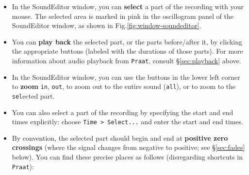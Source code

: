 \documentclass[
]{book}
\begin{document}
\begin{itemize}
\item
  In the SoundEditor window, you can \textbf{select} a part of the recording with your mouse. The selected area is marked in pink in the oscillogram panel of the SoundEditor window, as shown in Fig.\ref{fig:window-soundeditor}.
\item
  You can \textbf{play back} the selected part, or the parts before/after it, by clicking the appropriate buttons (labeled with the durations of those parts). For more information about audio playback from \texttt{Praat}, consult §\ref{sec:playback} above.
\item
  In the SoundEditor window, you can use the buttons in the lower left corner to \textbf{zoom} \texttt{in}, \texttt{out}, to zoom out to the entire sound (\texttt{all}), or to zoom to the \texttt{sel}ected part.
\item
  You can also select a part of the recording by specifying the start and end times explicitly: choose \texttt{Time\ \textgreater{}\ Select...} and enter the start and end times.
\item
  By convention, the selected part should begin and end at \textbf{positive zero crossings} (where the signal changes from negative to positive; see §\ref{sec:fades} below). You can find these precise places as follows (disregarding shortcuts in \texttt{Praat}):


\end{itemize}
\end{document}
